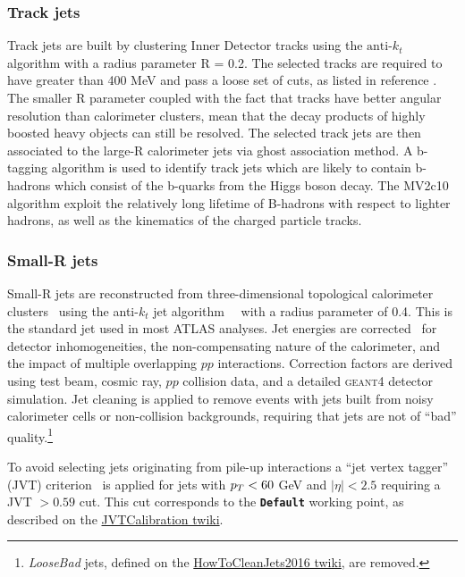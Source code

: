 \subsubsection{Track jets}
Track jets are built by clustering Inner Detector tracks using the ${\text{anti-}k_{t}}$ algorithm with a radius parameter R = 0.2. The selected tracks are required to have \pt greater than 400 MeV and pass a loose set of cuts, as listed in reference \cite{ATL-PHYS-PUB-2015-035}. The smaller R parameter coupled with the fact that tracks have better angular resolution than calorimeter clusters, mean that the decay products of highly boosted heavy objects can still be resolved. The selected track jets are then associated to the large-R calorimeter jets via ghost association \cite{Cacciari:2008gn} method. A b-tagging algorithm is used to identify track jets which are likely to contain b-hadrons which consist of the b-quarks from the Higgs boson decay. The MV2c10 algorithm exploit the relatively long lifetime of B-hadrons with respect to lighter hadrons, as well as the kinematics of the charged particle tracks.
\subsubsection{Small-R jets}
Small-R jets are reconstructed from three-dimensional topological calorimeter 
clusters~\cite{ATLAS-TopoClustering} using the anti-$k_t$ jet 
algorithm~~\cite{antikt_algorithm} with a radius parameter of 0.4. This is the standard jet used in most ATLAS analyses.
Jet energies are corrected~\cite{ATLAS-JES-RUN2} for detector inhomogeneities, the non-compensating nature of the calorimeter, and the impact of multiple overlapping $pp$ interactions. Correction factors are derived using test beam, cosmic ray, $pp$ collision data, and a detailed \textsc{geant4} detector simulation.
Jet cleaning is applied to remove events with jets built from noisy
calorimeter cells or non-collision backgrounds, requiring that jets
are not of ``bad'' quality.\footnote{\textit{LooseBad} jets, 
defined on the \href{https://twiki.cern.ch/twiki/bin/view/AtlasProtected/HowToCleanJets2016}{HowToCleanJets2016 twiki}, 
are removed.}

To avoid selecting jets originating from pile-up interactions a ``jet vertex tagger'' (JVT) criterion~\cite{ATLAS-JVTPaper} is applied for jets with $\pt < 60$ GeV and $|\eta|< 2.5$ requiring a JVT $ > 0.59$ cut. This cut corresponds to the \texttt{\textbf{Default}} working point, as described on the \href{https://twiki.cern.ch/twiki/bin/view/AtlasProtected/JVTCalibration}{JVTCalibration twiki}.



